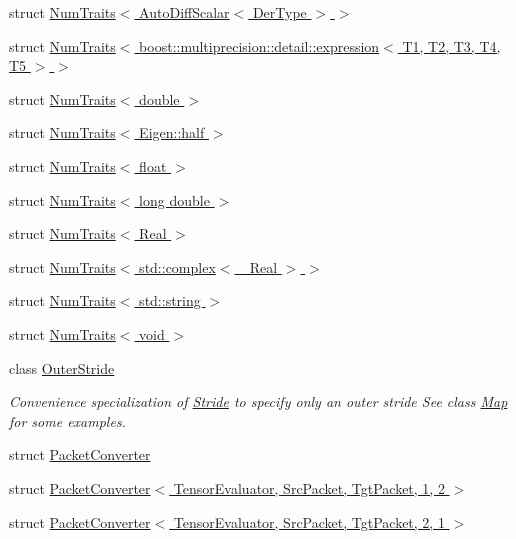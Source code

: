 \begin{DoxyCompactItemize}
struct \hyperlink{struct_eigen_1_1_num_traits_3_01_auto_diff_scalar_3_01_der_type_01_4_01_4}{Num\+Traits$<$ Auto\+Diff\+Scalar$<$ Der\+Type $>$ $>$}
\item 
struct \hyperlink{struct_eigen_1_1_num_traits_3_01boost_1_1multiprecision_1_1detail_1_1expression_3_01_t1_00_01_t2de536fef90a65f9e6892d34a2e1ed34d}{Num\+Traits$<$ boost\+::multiprecision\+::detail\+::expression$<$ T1, T2, T3, T4, T5 $>$ $>$}
\item 
struct \hyperlink{struct_eigen_1_1_num_traits_3_01double_01_4}{Num\+Traits$<$ double $>$}
\item 
struct \hyperlink{struct_eigen_1_1_num_traits_3_01_eigen_1_1half_01_4}{Num\+Traits$<$ Eigen\+::half $>$}
\item 
struct \hyperlink{struct_eigen_1_1_num_traits_3_01float_01_4}{Num\+Traits$<$ float $>$}
\item 
struct \hyperlink{struct_eigen_1_1_num_traits_3_01long_01double_01_4}{Num\+Traits$<$ long double $>$}
\item 
struct \hyperlink{struct_eigen_1_1_num_traits_3_01_real_01_4}{Num\+Traits$<$ Real $>$}
\item 
struct \hyperlink{struct_eigen_1_1_num_traits_3_01std_1_1complex_3_01___real_01_4_01_4}{Num\+Traits$<$ std\+::complex$<$ \+\_\+\+Real $>$ $>$}
\item 
struct \hyperlink{struct_eigen_1_1_num_traits_3_01std_1_1string_01_4}{Num\+Traits$<$ std\+::string $>$}
\item 
struct \hyperlink{struct_eigen_1_1_num_traits_3_01void_01_4}{Num\+Traits$<$ void $>$}
\item 
class \hyperlink{class_eigen_1_1_outer_stride}{Outer\+Stride}
\begin{DoxyCompactList}\small\item\em Convenience specialization of \hyperlink{group___core___module_class_eigen_1_1_stride}{Stride} to specify only an outer stride See class \hyperlink{group___core___module_class_eigen_1_1_map}{Map} for some examples. \end{DoxyCompactList}\item 
struct \hyperlink{struct_eigen_1_1_packet_converter}{Packet\+Converter}
\item 
struct \hyperlink{struct_eigen_1_1_packet_converter_3_01_tensor_evaluator_00_01_src_packet_00_01_tgt_packet_00_011_00_012_01_4}{Packet\+Converter$<$ Tensor\+Evaluator, Src\+Packet, Tgt\+Packet, 1, 2 $>$}
\item 
struct \hyperlink{struct_eigen_1_1_packet_converter_3_01_tensor_evaluator_00_01_src_packet_00_01_tgt_packet_00_012_00_011_01_4}{Packet\+Converter$<$ Tensor\+Evaluator, Src\+Packet, Tgt\+Packet, 2, 1 $>$}

\end{DoxyCompactItemize}
